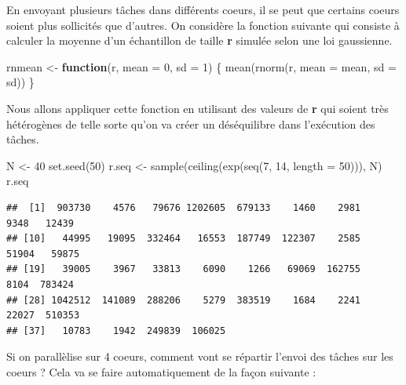 \documentclass[
]{book}
\newenvironment{Shaded}{\begin{snugshade}}{\end{snugshade}}
\newcommand{\AttributeTok}[1]{\textcolor[rgb]{0.77,0.63,0.00}{#1}}
\newcommand{\ControlFlowTok}[1]{\textcolor[rgb]{0.13,0.29,0.53}{\textbf{#1}}}
\newcommand{\DecValTok}[1]{\textcolor[rgb]{0.00,0.00,0.81}{#1}}
\newcommand{\FunctionTok}[1]{\textcolor[rgb]{0.00,0.00,0.00}{#1}}
\newcommand{\NormalTok}[1]{#1}
\newcommand{\OtherTok}[1]{\textcolor[rgb]{0.56,0.35,0.01}{#1}}
\theoremstyle{definition}
\theoremstyle{definition}
\theoremstyle{definition}
\theoremstyle{definition}
\theoremstyle{remark}
\begin{document}
En envoyant plusieurs tâches dans différents coeurs, il se peut que certains coeurs soient plus sollicités que d'autres. On considère la fonction suivante qui consiste à calculer la moyenne d'un échantillon de taille \textbf{r} simulée selon une loi gaussienne.

\begin{Shaded}
\begin{Highlighting}[]
\NormalTok{rnmean }\OtherTok{\textless{}{-}} \ControlFlowTok{function}\NormalTok{(r, }\AttributeTok{mean =} \DecValTok{0}\NormalTok{, }\AttributeTok{sd =} \DecValTok{1}\NormalTok{) \{}
        \FunctionTok{mean}\NormalTok{(}\FunctionTok{rnorm}\NormalTok{(r, }\AttributeTok{mean =}\NormalTok{ mean, }\AttributeTok{sd =}\NormalTok{ sd))}
\NormalTok{\}}
\end{Highlighting}
\end{Shaded}

Nous allons appliquer cette fonction en utilisant des valeurs de \textbf{r} qui soient très hétérogènes de telle sorte qu'on va créer un déséquilibre dans l'exécution des tâches.

\begin{Shaded}
\begin{Highlighting}[]
\NormalTok{N }\OtherTok{\textless{}{-}} \DecValTok{40}
\FunctionTok{set.seed}\NormalTok{(}\DecValTok{50}\NormalTok{)}
\NormalTok{r.seq }\OtherTok{\textless{}{-}} \FunctionTok{sample}\NormalTok{(}\FunctionTok{ceiling}\NormalTok{(}\FunctionTok{exp}\NormalTok{(}\FunctionTok{seq}\NormalTok{(}\DecValTok{7}\NormalTok{, }\DecValTok{14}\NormalTok{, }\AttributeTok{length =} \DecValTok{50}\NormalTok{))), N)}
\NormalTok{r.seq}
\end{Highlighting}
\end{Shaded}

\begin{verbatim}
##  [1]  903730    4576   79676 1202605  679133    1460    2981    9348   12439
## [10]   44995   19095  332464   16553  187749  122307    2585   51904   59875
## [19]   39005    3967   33813    6090    1266   69069  162755    8104  783424
## [28] 1042512  141089  288206    5279  383519    1684    2241   22027  510353
## [37]   10783    1942  249839  106025
\end{verbatim}

Si on parallèlise sur 4 coeurs, comment vont se répartir l'envoi des tâches sur les coeurs ? Cela va se faire automatiquement de la façon suivante :
\end{document}
